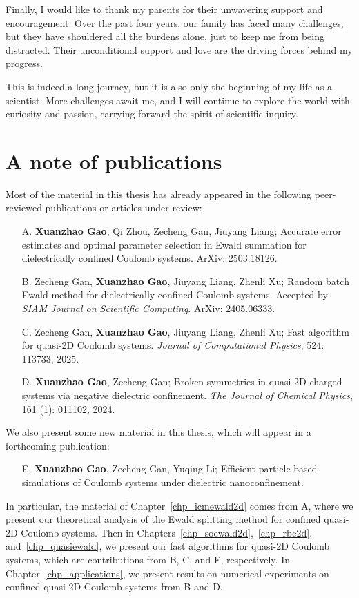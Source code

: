 Finally, I would like to thank my parents for their unwavering support and encouragement.
Over the past four years, our family has faced many challenges, but they have shouldered all the burdens alone, just to keep me from being distracted.
Their unconditional support and love are the driving forces behind my progress.

This is indeed a long journey, but it is also only the beginning of my life as a scientist.
More challenges await me, and I will continue to explore the world with curiosity and passion, carrying forward the spirit of scientific inquiry.


\section*{A note of publications}

Most of the material in this thesis has already appeared in the following peer-reviewed publications or articles under review:
\begin{itemize}
    \item[A.] \textbf{Xuanzhao Gao}, Qi Zhou, Zecheng Gan, Jiuyang Liang; Accurate error estimates and optimal parameter selection in Ewald summation for dielectrically confined Coulomb systems. ArXiv: 2503.18126.
    \item[B.] Zecheng Gan, \textbf{Xuanzhao Gao}, Jiuyang Liang, Zhenli Xu; Random batch Ewald method for dielectrically confined Coulomb systems. Accepted by \emph{SIAM Journal on Scientific Computing}. ArXiv: 2405.06333.
    \item[C.] Zecheng Gan, \textbf{Xuanzhao Gao}, Jiuyang Liang, Zhenli Xu; Fast algorithm for quasi-2D Coulomb systems. \emph{Journal of Computational Physics}, 524: 113733, 2025.
    \item[D.] \textbf{Xuanzhao Gao}, Zecheng Gan; Broken symmetries in quasi-2D charged systems via negative dielectric confinement. \emph{The Journal of Chemical Physics}, 161 (1): 011102, 2024.
\end{itemize}
We also present some new material in this thesis, which will appear in a forthcoming publication:
\begin{itemize}
    \item[E.] \textbf{Xuanzhao Gao}, Zecheng Gan, Yuqing Li; Efficient particle-based simulations of Coulomb systems under dielectric nanoconfinement.
\end{itemize}
In particular, the material of Chapter~\ref{chp_icmewald2d} comes from A, where we present our theoretical analysis of the Ewald splitting method for confined quasi-2D Coulomb systems.
Then in Chapters~\ref{chp_soewald2d},~\ref{chp_rbe2d}, and~\ref{chp_quasiewald}, we present our fast algorithms for quasi-2D Coulomb systems, which are contributions from B, C, and E, respectively.
In Chapter~\ref{chp_applications}, we present results on numerical experiments on confined quasi-2D Coulomb systems from B and D.